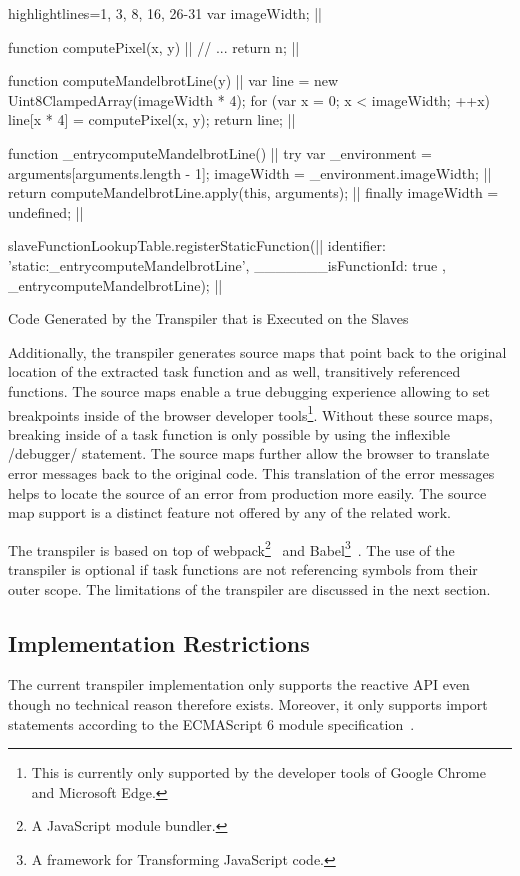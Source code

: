\begin{listing}
\begin{javascriptcode*}{highlightlines={1, 3, 8, 16, 26-31}}
var imageWidth; |$\label{code:slave-image-width}$|

function computePixel(x, y) { |$\label{code:slave-compute-pixel-start}$|
	// ...
	return n;
}|$\label{code:slave-compute-pixel-end}$|

function computeMandelbrotLine(y) { |$\label{code:slave-task function-start}$|
	var line = new Uint8ClampedArray(imageWidth * 4);
	for (var x = 0; x < imageWidth; ++x) {
		line[x * 4] = computePixel(x, y);
	}
	return line;
}|$\label{code:slave-task function-end}$|
 
function _entrycomputeMandelbrotLine() { |$\label{code:slave-entry-function-start}$|
	try {
		var _environment = arguments[arguments.length - 1];
		imageWidth = _environment.imageWidth; |$\label{code:slave-init-variable}$|
		return computeMandelbrotLine.apply(this, arguments); |$\label{code:call-task-function}$|
	} finally {
		imageWidth = undefined;
	}
} |$\label{code:slave-entry-function-end}$|

slaveFunctionLookupTable.registerStaticFunction({|$\label{code:slave-register-function-start}$|
		identifier: 'static:_entrycomputeMandelbrotLine',
		_______isFunctionId: true
	}, _entrycomputeMandelbrotLine); |$\label{code:slave-register-function-end}$|
\end{javascriptcode*}
\caption{Code Generated by the Transpiler that is Executed on the Slaves}
\label{fig:transpiled-mandelbrot-slave}
\end{listing}

Additionally, the transpiler generates source maps that point back to the original location of the extracted task function and as well, transitively referenced functions. The source maps enable a true debugging experience allowing to set breakpoints inside of the browser developer tools\footnote{This is currently only supported by the developer tools of Google Chrome and Microsoft Edge.}. Without these source maps, breaking inside of a task function is only possible by using the inflexible \javascriptinline/debugger/ statement. The source maps further allow the browser to translate error messages back to the original code. This translation of the error messages helps to locate the source of an error from production more easily. The source map support is a distinct feature not offered by any of the related work.

The transpiler is based on top of webpack\footnote{A JavaScript module bundler.}~\cite{webpack} and Babel\footnote{A framework for Transforming JavaScript code.}~\cite{babel}. The use of the transpiler is optional if task functions are not referencing symbols from their outer scope. The limitations of the transpiler are discussed in the next section.

\subsection{Implementation Restrictions}
The current transpiler implementation only supports the reactive API even though no technical reason therefore exists. Moreover, it only supports import statements according to the ECMAScript 6 module specification~\cite[Section 15.2]{ecmaScript2015}.

